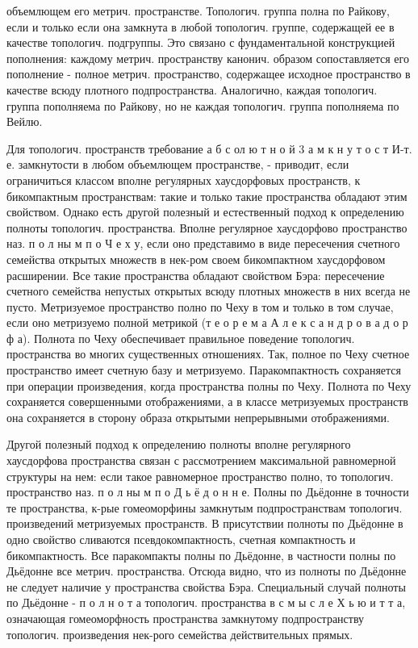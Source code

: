 \documentclass[10pt]{article}
\begin{document}
объемлющем его метрич. пространстве. Топологич. группа полна по Райкову, если и только если она замкнута в любой топологич. группе, содержащей ее в качестве топологич. подгруппы. Это связано с фундаментальной конструкцией пополнения: каждому метрич. пространству канонич. образом сопоставляется его пополнение - полное метрич. пространство, содержащее исходное пространство в качестве всюду плотного подпространства. Аналогично, каждая топологич. группа пополняема по Райкову, но не каждая топологич. группа пополняема по Вейлю.



Для топологич. пространств требование а б с ол ю т н о й 3 а м к н у т о с т И-т. е. замкнутости в любом объемлющем пространстве, - приводит, если ограничиться классом вполне регулярных хаусдорфовых пространств, к бикомпактным пространствам: такие и только такие пространства обладают этим свойством. Однако есть другой полезный и естественный подход к определению полноты топологич. пространства. Вполне регулярное хаусдорфово пространство наз. п о л ны м п о Ч е х у, если оно представимо в виде пересечения счетного семейства открытых множеств в нек-ром своем бикомпактном хаусдорфовом расширении. Все такие пространства обладают свойством Бэра: пересечение счетного семейства непустых открытых всюду плотных множеств в них всегда не пусто. Метризуемое пространство полно по Чеху в том и только в том случае, если оно метризуемо полной метрикой (т е о р е м а А л е к с а н д р о в а д о р ф а). Полнота по Чеху обеспечивает правильное поведение топологич. пространства во многих существенных отношениях. Так, полное по Чеху счетное пространство имеет счетную базу и метризуемо. Паракомпактность сохраняется при операции произведения, когда пространства полны по Чеху. Полнота по Чеху сохраняется совершенными отображениями, а в классе метризуемых пространств она сохраняется в сторону образа открытыми непрерывными отображениями.



Другой полезный подход к определению полноты вполне регулярного хаусдорфова пространства связан с рассмотрением максимальной равномерной структуры на нем: если такое равномерное пространство полно, то топологич. пространство наз. п о л ны м п о Д ь ё д о н н е. Полны по Дьёдонне в точности те пространства, к-рые гомеоморфины замкнутым подпространствам топологич. произведений метризуемых пространств. В присутствии полноты по Дьёдонне в одно свойство сливаются псевдокомпактность, счетная компактность и бикомпактность. Все паракомпакты полны по Дьёдонне, в частности полны по Дьёдонне все метрич. пространства. Отсюда видно, что из полноты по Дьёдонне не следует наличие у пространства свойства Бэра. Специальный случай полноты по Дьёдонне - п о л н о т а топологич. пространства в с м ы с л е Х ь ю и т т а, означающая гомеоморфность пространства замкнутому подпространству топологич. произведения нек-рого семейства действительных прямых.
\end{document}
